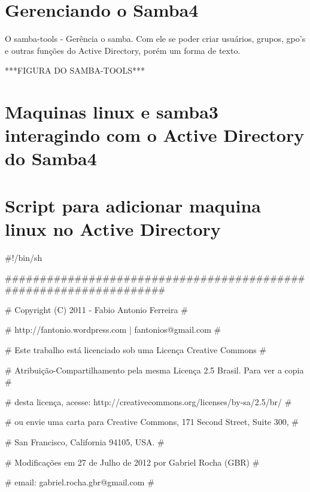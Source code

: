 \section{Gerenciando o Samba4}

O samba-tools - Gerência o samba. Com ele se poder criar usuários, grupos, gpo's e outras funções do Active Directory, porém um forma de texto.

***FIGURA DO SAMBA-TOOLS***

\section{Maquinas linux e samba3 interagindo com o Active Directory do  Samba4}

\section{Script para adicionar maquina linux no Active Directory}

\#!/bin/sh
 
\#\#\#\#\#\#\#\#\#\#\#\#\#\#\#\#\#\#\#\#\#\#\#\#\#\#\#\#\#\#\#\#\#\#\#\#\#\#\#\#\#\#\#\#\#\#\#\#\#\#\#\#\#\#\#\#\#\#\#\#\#\#\#\#\#\#

\# Copyright (C) 2011 - Fabio Antonio Ferreira \hspace{160pt} \#

\# http://fantonio.wordpress.com | fantonios@gmail.com \hspace{106pt} \#

\# Este trabalho está licenciado sob uma Licença Creative Commons \hspace{59pt} \#

\# Atribuição-Compartilhamento pela mesma Licença 2.5 Brasil. Para ver a copia \#

\# desta licença, acesse: http://creativecommons.org/licenses/by-sa/2.5/br/ \hspace{34pt} \#

\# ou envie uma carta para Creative Commons, 171 Second Street, Suite 300, \hspace{19pt} \#

\# San Francisco, California 94105, USA. \hspace{188pt} \#

\# Modificações em 27 de Julho de 2012 por Gabriel Rocha (GBR) \hspace{67pt}             \#

\# email: gabriel.rocha.gbr@gmail.com \hspace{198pt} \#

